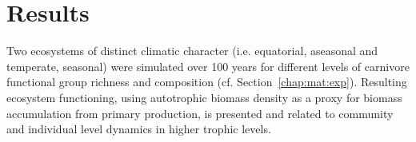 \chapter{Results}
\label{chap:res}
Two ecosystems of distinct climatic character (i.e. equatorial, aseasonal and temperate, seasonal) were simulated over 100 years for different levels of carnivore functional group richness and composition (cf. Section~\ref{chap:mat:exp}). 
Resulting ecosystem functioning, using autotrophic biomass density as a proxy for biomass accumulation from primary production, is presented and related to community and individual level dynamics in higher trophic levels.
%

